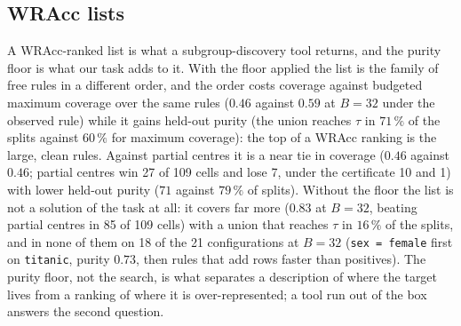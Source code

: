 \documentclass[11pt]{article}
\begin{document}
\subsection{WRAcc lists}\label{sec:wracc}
A WRAcc-ranked list is what a subgroup-discovery tool returns, and the purity floor is what our task adds to it. With the floor applied the list is the family of free rules in a different order, and the order costs coverage against budgeted maximum coverage over the same rules ($0.46$ against $0.59$ at $B=32$ under the observed rule) while it gains held-out purity (the union reaches $\tau$ in $71\,\%$ of the splits against $60\,\%$ for maximum coverage): the top of a WRAcc ranking is the large, clean rules. Against partial centres it is a near tie in coverage ($0.46$ against $0.46$; partial centres win 27 of 109 cells and lose 7, under the certificate 10 and 1) with lower held-out purity ($71$ against $79\,\%$ of splits). Without the floor the list is not a solution of the task at all: it covers far more ($0.83$ at $B=32$, beating partial centres in 85 of 109 cells) with a union that reaches $\tau$ in $16\,\%$ of the splits, and in none of them on 18 of the 21 configurations at $B=32$ (\texttt{sex = female} first on \texttt{titanic}, purity $0.73$, then rules that add rows faster than positives). The purity floor, not the search, is what separates a description of where the target lives from a ranking of where it is over-represented; a tool run out of the box answers the second question.
\end{document}
